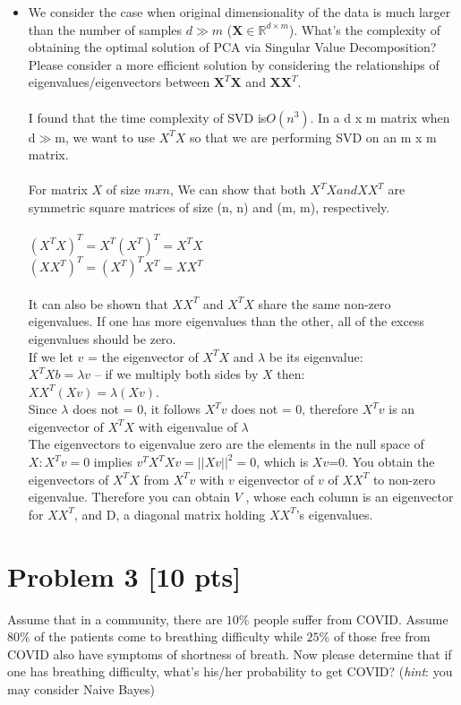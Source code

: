 \documentclass[11pt]{article}
\newcommand{\R}{\mathbb{R}}
\newcommand{\mtx}[1]{\mathbf{#1}}
\def \mX {\mtx{X}}
\def \R {\mathbb{R}}
\begin{document}
\begin{itemize}
	\item We consider the case when original dimensionality of the data is much larger than the number of samples $d\gg m$ ($\mX\in\R^{d\times m}$). What's the complexity of obtaining the optimal solution of PCA via Singular Value Decomposition? Please consider a more efficient solution by considering the relationships of eigenvalues/eigenvectors between $\mX^T\mX$ and $\mX\mX^T$.\\\\
	I found that the time complexity of SVD is$O(n^3)$. In a d x m matrix when d$\gg$m, we want to use $X^TX$ so that we are performing SVD on an m x m matrix.\\\\
	For matrix $X$ of size $m x n$, We can show that both $X^TX and XX^T$ are symmetric square matrices of size (n, n) and (m, m), respectively.\\\\
	$(X^TX)^T = X^T (X^T)^T = X^TX$\\
	$(XX^T)^T = (X^T)^T X^T = XX^T$\\\\
	It can also be shown that $XX^T$ and $X^TX$ share the same non-zero eigenvalues. If one has more eigenvalues than the other, all of the excess eigenvalues should be zero.\\
	If we let $v$ = the eigenvector of $X^TX$ and $\lambda$ be its eigenvalue:\\
	$X^TXb = \lambda v$ -- if we multiply both sides by $X$ then:\\
	$XX^T (Xv) = \lambda (X v)$.\\ Since $\lambda$ does not = 0, it follows $X^T v$ does not = 0, therefore $X^T v$ is an eigenvector of $X^TX$ with eigenvalue of $\lambda$\\
	The eigenvectors to eigenvalue zero are the elements in the null space of $X: X^T v = 0$ implies $v^TX^TXv = ||Xv||^2 = 0$, which is $Xv$=0. You obtain the eigenvectors of $X^TX$ from $X^Tv$  with $v$ eigenvector of $v$ of $XX^T$ to non-zero eigenvalue. Therefore you can obtain $V$ , whose each column is an eigenvector for $XX^T$, and D, a diagonal matrix holding $XX^T$'s eigenvalues.
\end{itemize}


\newpage
\section*{Problem 3 [10 pts]}
Assume that in a community, there are $10\%$ people suffer from COVID. Assume $80\%$ of the patients come to breathing difficulty while $25\%$ of those free from COVID also have symptoms of shortness of breath. Now please determine that if one has breathing difficulty, what's his/her probability to get COVID? (\textit{hint}: you may consider Naive Bayes)\\
\end{document}
